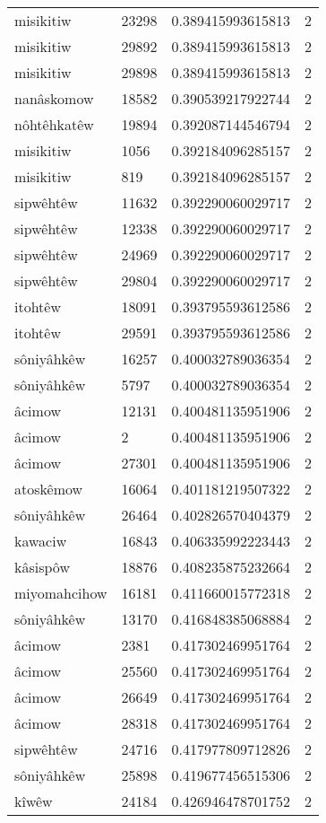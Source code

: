 \begin{longtable}{llll}
misikitiw & 23298 & 0.389415993615813 & 2 \\
misikitiw & 29892 & 0.389415993615813 & 2 \\
misikitiw & 29898 & 0.389415993615813 & 2 \\
nanâskomow & 18582 & 0.390539217922744 & 2 \\
nôhtêhkatêw & 19894 & 0.392087144546794 & 2 \\
misikitiw & 1056 & 0.392184096285157 & 2 \\
misikitiw & 819 & 0.392184096285157 & 2 \\
sipwêhtêw & 11632 & 0.392290060029717 & 2 \\
sipwêhtêw & 12338 & 0.392290060029717 & 2 \\
sipwêhtêw & 24969 & 0.392290060029717 & 2 \\
sipwêhtêw & 29804 & 0.392290060029717 & 2 \\
itohtêw & 18091 & 0.393795593612586 & 2 \\
itohtêw & 29591 & 0.393795593612586 & 2 \\
sôniyâhkêw & 16257 & 0.400032789036354 & 2 \\
sôniyâhkêw & 5797 & 0.400032789036354 & 2 \\
âcimow & 12131 & 0.400481135951906 & 2 \\
âcimow & 2 & 0.400481135951906 & 2 \\
âcimow & 27301 & 0.400481135951906 & 2 \\
atoskêmow & 16064 & 0.401181219507322 & 2 \\
sôniyâhkêw & 26464 & 0.402826570404379 & 2 \\
kawaciw & 16843 & 0.406335992223443 & 2 \\
kâsispôw & 18876 & 0.408235875232664 & 2 \\
miyomahcihow & 16181 & 0.411660015772318 & 2 \\
sôniyâhkêw & 13170 & 0.416848385068884 & 2 \\
âcimow & 2381 & 0.417302469951764 & 2 \\
âcimow & 25560 & 0.417302469951764 & 2 \\
âcimow & 26649 & 0.417302469951764 & 2 \\
âcimow & 28318 & 0.417302469951764 & 2 \\
sipwêhtêw & 24716 & 0.417977809712826 & 2 \\
sôniyâhkêw & 25898 & 0.419677456515306 & 2 \\
kîwêw & 24184 & 0.426946478701752 & 2 \\

\end{longtable}
